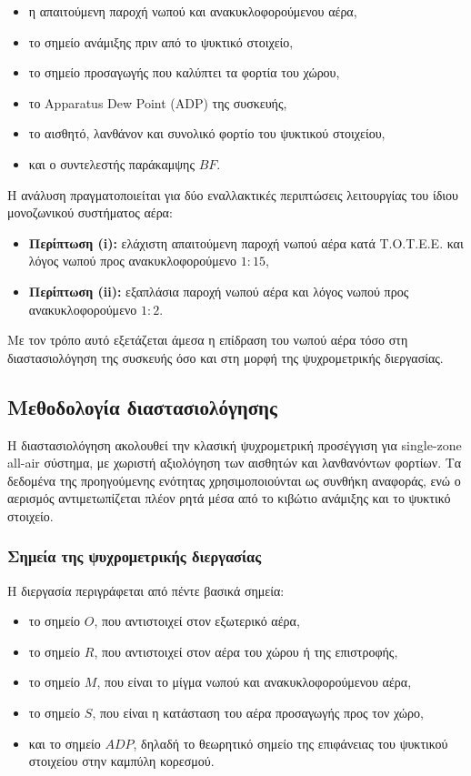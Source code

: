 \documentclass[12pt,a4paper]{article}
\begin{document}
\begin{itemize}
\item η απαιτούμενη παροχή νωπού και ανακυκλοφορούμενου αέρα,
\item το σημείο ανάμιξης πριν από το ψυκτικό στοιχείο,
\item το σημείο προσαγωγής που καλύπτει τα φορτία του χώρου,
\item το \textenglish{Apparatus Dew Point (ADP)} της συσκευής,
\item το αισθητό, λανθάνον και συνολικό φορτίο του ψυκτικού στοιχείου,
\item και ο συντελεστής παράκαμψης \(BF\).
\end{itemize}

Η ανάλυση πραγματοποιείται για δύο εναλλακτικές περιπτώσεις λειτουργίας του ίδιου
μονοζωνικού συστήματος αέρα:

\begin{itemize}
\item \textbf{Περίπτωση (i):} ελάχιστη απαιτούμενη παροχή νωπού αέρα κατά Τ.Ο.Τ.Ε.Ε. και λόγος νωπού προς ανακυκλοφορούμενο \(1:15\),
\item \textbf{Περίπτωση (ii):} εξαπλάσια παροχή νωπού αέρα και λόγος νωπού προς ανακυκλοφορούμενο \(1:2\).
\end{itemize}

Με τον τρόπο αυτό εξετάζεται άμεσα η επίδραση του νωπού αέρα τόσο στη
διαστασιολόγηση της συσκευής όσο και στη μορφή της ψυχρομετρικής διεργασίας.

\subsection{Μεθοδολογία διαστασιολόγησης}

Η διαστασιολόγηση ακολουθεί την κλασική ψυχρομετρική προσέγγιση για
\textenglish{single-zone all-air} σύστημα, με χωριστή αξιολόγηση των αισθητών και
λανθανόντων φορτίων. Τα δεδομένα της προηγούμενης ενότητας χρησιμοποιούνται ως
συνθήκη αναφοράς, ενώ ο αερισμός αντιμετωπίζεται πλέον ρητά μέσα από το κιβώτιο
ανάμιξης και το ψυκτικό στοιχείο.

\subsubsection{Σημεία της ψυχρομετρικής διεργασίας}

Η διεργασία περιγράφεται από πέντε βασικά σημεία:

\begin{itemize}
\item το σημείο \(O\), που αντιστοιχεί στον εξωτερικό αέρα,
\item το σημείο \(R\), που αντιστοιχεί στον αέρα του χώρου ή της επιστροφής,
\item το σημείο \(M\), που είναι το μίγμα νωπού και ανακυκλοφορούμενου αέρα,
\item το σημείο \(S\), που είναι η κατάσταση του αέρα προσαγωγής προς τον χώρο,
\item και το σημείο \(ADP\), δηλαδή το θεωρητικό σημείο της επιφάνειας του ψυκτικού στοιχείου στην καμπύλη κορεσμού.
\end{itemize}
\end{document}
